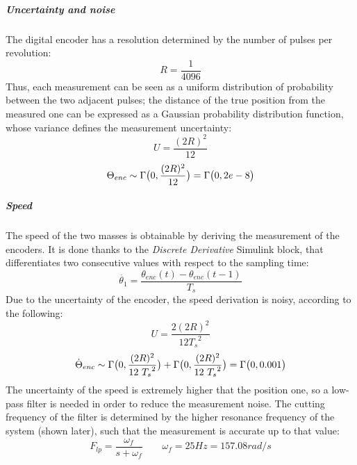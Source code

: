 \subparagraph{Uncertainty and noise}

The digital encoder has a resolution determined by the number of pulses per revolution:
\[
	R = \frac{1}{4096}
\]
Thus, each measurement can be seen as a uniform distribution of probability between the two adjacent pulses; the distance of the true position from the measured one can be expressed as a Gaussian probability distribution function, whose variance defines the measurement uncertainty:
\[
	U = \frac{(2R)^2}{12}
\]
\[
	\Theta_{enc} \sim \Gamma \bigl{(} 0,\frac{(2R)^2}{12} \bigr{)} = \Gamma \bigl{(} 0, 2e-8 \bigr{)}
\]

\subparagraph{Speed}

The speed of the two masses is obtainable by deriving the measurement of the encoders. It is done thanks to the \textit{Discrete Derivative} Simulink block, that differentiates two consecutive values with respect to the sampling time:
\[
	\dot{\theta_1} = \frac{ \theta_{enc}(t) - \theta_{enc}(t-1)}{T_s}
\]
Due to the uncertainty of the encoder, the speed derivation is noisy, according to the following:
\[
	U = \frac{2(2R)^2}{12 {T_s}^2 }
\]
\[
	\dot{\Theta}_{enc}	\sim \Gamma \bigl{(} 0,\frac{(2R)^2}{12 \ {T_s}^2} \bigr{)} + \Gamma \bigl{(} 0,\frac{(2R)^2}{12 \ {T_s}^2} \bigr{)} = \Gamma \bigl{(} 0, 0.001 \bigr{)}
\]
The uncertainty of the speed is extremely higher that the position one, so a low-pass filter is needed in order to reduce the measurement noise. The cutting frequency of the filter is determined by the higher resonance frequency of the system (shown later), such that the measurement is accurate up to that value:
\[
	F_{lp} = \frac{ \omega_f }{ s+\omega_f} \qquad \omega_f=25Hz=157.08 rad/s
\]